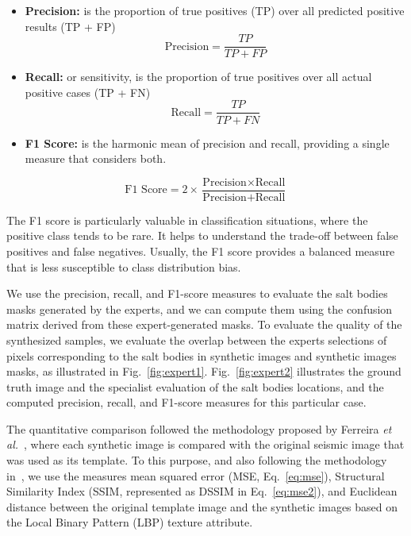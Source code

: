 \documentclass{ieeeaccess}
\begin{document}
\begin{itemize}
    \item \textbf{Precision:} is the proportion of true positives (TP) over all predicted positive results (TP + FP)
    \begin{equation}
    \text{Precision} = \frac{TP}{TP + FP}
    \end{equation}

    \item \textbf{Recall:} or sensitivity, is the proportion of true positives over all actual positive cases (TP + FN)
    \begin{equation}
    \text{Recall} = \frac{TP}{TP + FN}
    \end{equation}

    \item \textbf{F1 Score:} is the harmonic mean of precision and recall, providing a single measure that considers both. 

\end{itemize}
    \begin{equation}
    \text{F1 Score} = 2 \times \frac{\text{Precision} \times \text{Recall}}{\text{Precision} + \text{Recall}}
    \end{equation}

The F1 score is particularly valuable in classification situations, where the positive class tends to be rare. It helps to understand the trade-off between false positives and false negatives. Usually, the F1 score provides a balanced measure that is less susceptible to class distribution bias.

We use the precision, recall, and F1-score measures to evaluate the salt bodies masks generated by the experts, and we can compute them using the confusion matrix derived from these expert-generated masks. To evaluate the quality of the synthesized samples, we evaluate the overlap between the experts selections of pixels corresponding to the salt bodies in synthetic images and synthetic images masks, as illustrated in Fig.~\ref{fig:expert1}. Fig.~\ref{fig:expert2} illustrates the ground truth image and the specialist evaluation of the salt bodies locations, and the computed precision, recall, and F1-score measures for this particular case.

The quantitative comparison followed the methodology proposed by Ferreira \emph{et al.}~\cite{Ferreira2020}, where each synthetic image is compared with the original seismic image that was used as its template. To this purpose, and also following the methodology in~\cite{Ferreira2020}, we use the measures mean squared error (MSE, Eq.~\ref{eq:mse}), Structural Similarity Index (SSIM, represented as DSSIM in Eq.~\ref{eq:mse2}), and Euclidean distance between the original template image and the synthetic images based on the Local Binary Pattern (LBP) texture attribute.
\end{document}
